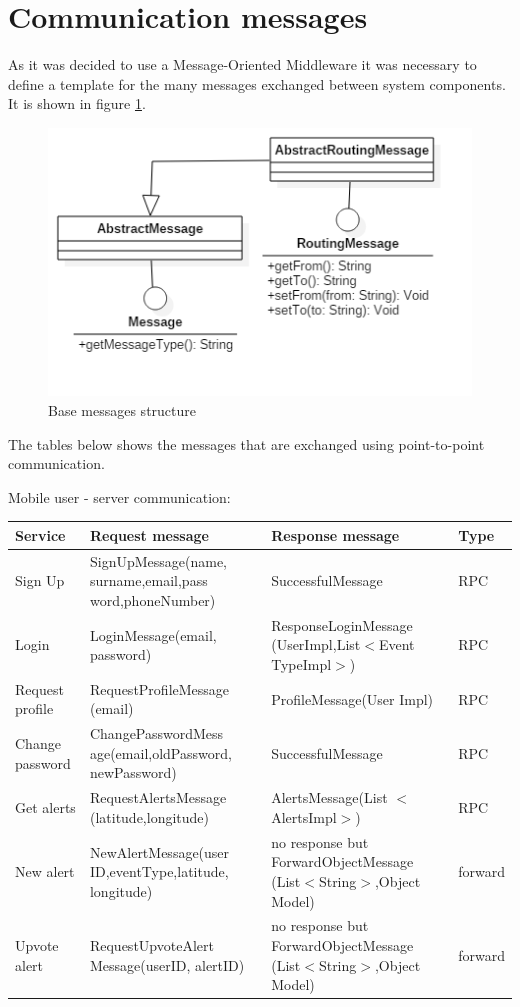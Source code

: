 \documentclass[a4paper,12pt]{report}
\begin{document}
\section{Communication messages}
As it was decided to use a Message-Oriented Middleware it was necessary to define a template for the many messages exchanged between system components. It is shown in figure \ref{fig:messageStruct}.

\begin{figure}[ht]
\centering
\includegraphics[scale=0.5]{figures/messages.png}
\caption{Base messages structure}
\label{fig:messageStruct}
\end{figure}

The tables below shows the messages that are exchanged using point-to-point communication.

Mobile user - server communication:

\begin{center}
\begin{tabular}{ |p{4cm}|p{4cm}|p{4cm}|p{2cm}| } 
\hline
Service 			& Request message 	& Response message		& Type 	\\
\hline
Sign Up  			& SignUpMessage(name, surname,email,pass word,phoneNumber)		& SuccessfulMessage 	& RPC	\\ 
Login 				& LoginMessage(email, password) 	& ResponseLoginMessage (UserImpl,List$<$Event TypeImpl$>$)	& RPC	\\ 
Request profile 	& RequestProfileMessage (email)		& ProfileMessage(User Impl)	& RPC	\\ 
Change password		& ChangePasswordMess age(email,oldPassword, newPassword)	& SuccessfulMessage	& RPC	\\
Get alerts		& RequestAlertsMessage (latitude,longitude)	& AlertsMessage(List $<$AlertsImpl$>$)	& RPC	\\
New alert		& NewAlertMessage(user ID,eventType,latitude, longitude)	& no response but ForwardObjectMessage (List$<$String$>$,Object Model)	& forward	\\
Upvote alert		& RequestUpvoteAlert Message(userID, alertID)	& no response but ForwardObjectMessage (List$<$String$>$,Object Model)	& forward	\\
\hline
\end{tabular}
\end{center}
\end{document}

